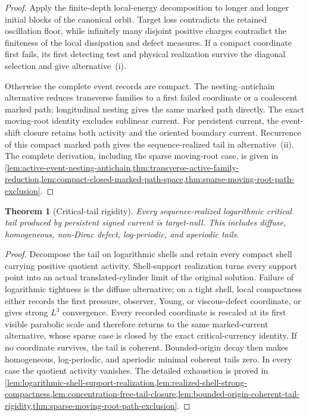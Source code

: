 \documentclass[11pt]{amsart}
\numberwithin{equation}{section}
\theoremstyle{plain}
\newtheorem{theorem}{Theorem}[section]
\theoremstyle{definition}
\theoremstyle{remark}
\begin{document}
\begin{proof}
Apply the finite-depth local-energy decomposition to longer and longer initial
blocks of the canonical orbit.  Target loss contradicts the retained
oscillation floor, while infinitely many disjoint positive charges contradict
the finiteness of the local dissipation and defect measures.  If a compact
coordinate first fails, its first detecting test and physical realization
survive the diagonal selection and give alternative~\textup{(i)}.

Otherwise the complete event records are compact.  The nesting--antichain
alternative reduces transverse families to a first failed coordinate or a
coalescent marked path; longitudinal nesting gives the same marked path
directly.  The exact moving-root identity excludes sublinear current.  For
persistent current, the event-shift closure retains both activity and the
oriented boundary current.  Recurrence of this compact marked path gives the
sequence-realized tail in alternative~\textup{(ii)}.  The complete derivation,
including the sparse moving-root case, is given in
\cref{lem:active-event-nesting-antichain,thm:transverse-active-family-reduction,lem:compact-closed-marked-path-space,thm:sparse-moving-root-path-exclusion}.
\end{proof}

\begin{theorem}[Critical-tail rigidity]
\label{thm:critical-tail-rigidity}
Every sequence-realized logarithmic critical tail produced by persistent
signed current is target-null.  This includes diffuse, homogeneous,
non-Dirac defect, log-periodic, and aperiodic tails.
\end{theorem}

\begin{proof}
Decompose the tail on logarithmic shells and retain every compact shell
carrying positive quotient activity.  Shell-support realization turns every
support point into an actual translated-cylinder limit of the original
solution.  Failure of logarithmic tightness is the diffuse alternative; on a
tight shell, local compactness either records the first pressure, observer,
Young, or viscous-defect coordinate, or gives strong \(L^3\) convergence.
Every recorded coordinate is rescaled at its first visible parabolic scale and
therefore returns to the same marked-current alternative, whose sparse case is
closed by the exact critical-currency identity.  If no coordinate survives,
the tail is coherent.  Bounded-origin decay then makes homogeneous,
log-periodic, and aperiodic minimal coherent tails zero.  In every case the
quotient activity vanishes.  The detailed exhaustion is proved in
\cref{lem:logarithmic-shell-support-realization,lem:realized-shell-strong-compactness,lem:concentration-free-tail-closure,lem:bounded-origin-coherent-tail-rigidity,thm:sparse-moving-root-path-exclusion}.
\end{proof}
\end{document}
